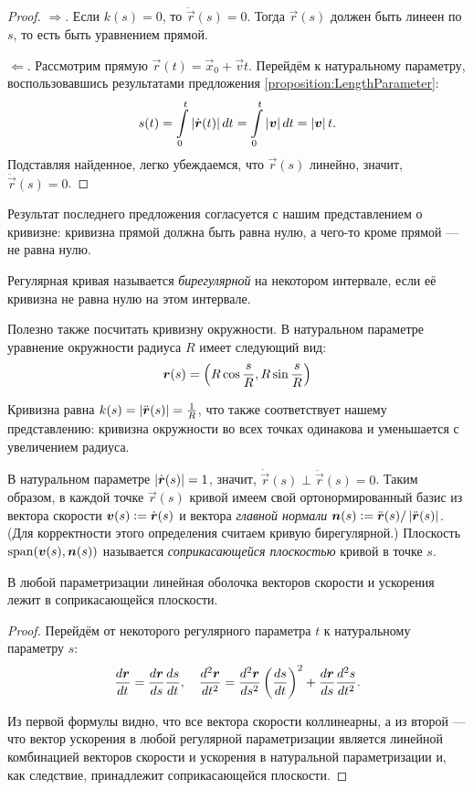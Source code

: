 \begin{proof}
	$\Rightarrow$. Если $k(s) = 0$, то $\ddot{\vec{r}}(s) = 0$. Тогда $\vec{r}(s)$ должен быть линеен по $s$, то есть быть уравнением прямой.

	$\Leftarrow$. Рассмотрим прямую $\vec{r}(t) = \vec{x}_0 + \vec{v}t$. Перейдём к натуральному параметру, воспользовавшись результатами предложения \ref{proposition:LengthParameter}:
	\[
		s(t) = \int\limits_0^t\abs{\dot{\vec{r}}(t)}dt = \int\limits_0^t \abs{\vec{v}}dt = \abs{\vec{v}}t.
	\]
	Подставляя найденное, легко убеждаемся, что $\vec{r}(s)$ линейно, значит, $\ddot{\vec{r}}(s) = 0$.
\end{proof}

Результат последнего предложения согласуется с нашим представлением о кривизне: кривизна прямой должна быть равна нулю, а чего-то кроме прямой --- не равна нулю.

\begin{definition}
	Регулярная кривая называется \textit{бирегулярной} на некотором интервале, если её кривизна не равна нулю на этом интервале.
\end{definition}

Полезно также посчитать кривизну окружности. В натуральном параметре уравнение окружности радиуса $R$ имеет следующий вид:
\[
	\vec{r}(s) = \br{R\cos\frac{s}{R}, R\sin\frac{s}{R}}
\]

Кривизна равна $k(s) = \abs{\ddot{\vec{r}}(s)} = \frac{1}{R}$, что также соответствует нашему представлению: кривизна окружности во всех точках одинакова и уменьшается с увеличением радиуса.

В натуральном параметре $\abs{\dot{\vec{r}}(s)} = 1$, значит, $\dot{\vec{r}}(s) \perp \ddot{\vec{r}}(s) = 0$. Таким образом, в каждой точке $\vec{r}(s)$ кривой имеем свой ортонормированный базис из вектора скорости $\vec{v}(s) \vcentcolon = \dot{\vec{r}}(s)$ и вектора \textit{главной нормали} $\vec{n}(s) \vcentcolon = \ddot{\vec{r}}(s) / \abs{\ddot{\vec{r}}(s)}$. (Для корректности этого определения считаем кривую бирегулярной.) Плоскость $\span(\vec{v}(s), \vec{n}(s))$ называется \textit{соприкасающейся плоскостью} кривой в точке $s$.

\begin{proposition} \label{proposition:TouchPlane}
	В любой параметризации линейная оболочка векторов скорости и ускорения лежит в соприкасающейся плоскости.
\end{proposition}

\begin{proof}
	Перейдём от некоторого регулярного параметра $t$ к натуральному параметру $s$:
	\[
		\frac{d\vec{r}}{dt} = \frac{d\vec{r}}{ds} \frac{ds}{dt},\quad \frac{d^2\vec{r}}{dt^2} = \frac{d^2\vec{r}}{ds^2}\br{\frac{ds}{dt}}^2 + \frac{d\vec{r}}{ds}\frac{d^2s}{dt^2}.
	\]

	Из первой формулы видно, что все вектора скорости коллинеарны, а из второй --- что вектор ускорения в любой регулярной параметризации является линейной комбинацией векторов скорости и ускорения в натуральной параметризации и, как следствие, принадлежит соприкасающейся плоскости.
\end{proof}

